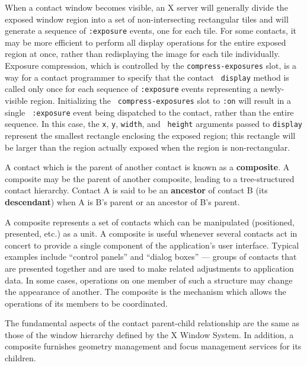 \documentclass[twoside]{book}
\begin{document}
\begin{sloppy}
When a contact window becomes visible, an X server will generally divide
the exposed window region into a set of non-intersecting rectangular
tiles and will generate a sequence of {\tt :exposure} events, one for
each tile. For some contacts, it may be more efficient to perform all
display operations for the entire exposed region at once, rather than
redisplaying the image for each tile individually. Exposure
compression, which is controlled by the {\tt compress-exposures} slot,
is a way for a contact programmer to specify that the contact {\tt
display} method is called only once for each sequence of {\tt :exposure}
events representing a newly-visible region. Initializing the {\tt
compress-exposures} slot to {\tt :on} will result in a single {\tt
:exposure} event being dispatched to the contact, rather than the entire
sequence. In this case, the {\tt x}, {\tt y}, {\tt width}, and {\tt
height} arguments passed to {\tt display} 
represent the smallest rectangle enclosing the exposed region; this
rectangle will be larger than the region actually exposed when the
region is non-rectangular.



A contact which is the parent of another contact is known as a
{\bf composite}. A composite 
may be the parent of another composite, leading to a
tree-structured contact hierarchy. Contact A is said to be an
{\bf ancestor} of contact B (its 
{\bf descendant}) when
A is B's parent or an ancestor of B's parent. 

A composite represents a set of contacts which can be manipulated
(positioned, presented,
etc.) as a unit. A composite is useful whenever several contacts act in concert to provide a
single component of the application's user interface. Typical examples include
``control panels'' and ``dialog boxes'' --- groups of contacts that are presented
together and are used to make related adjustments to application data. In some
cases, operations on one member of such a structure may change the appearance of
another. The composite is the mechanism which allows the operations of its
members to be coordinated.

The fundamental aspects of the contact parent-child relationship are the same as
those of the window hierarchy defined by the X Window System. In addition, a
composite furnishes geometry management and focus management services for
its children.


\end{sloppy}
\end{document}
